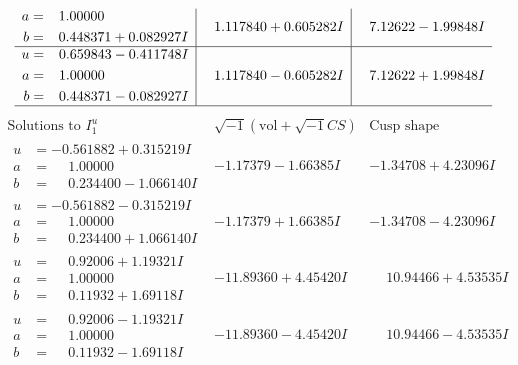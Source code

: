 \documentclass[1p]{elsarticle_modified}
\theoremstyle{definition}
\newcommand{\I}{\sqrt{-1}}
\begin{document}
$$\begin{array}{c|c|c}
\begin{aligned}
a &= \phantom{-}1.00000\phantom{ +0.000000I} \\
b &= \phantom{-}0.448371 + 0.082927 I\end{aligned}
 & \phantom{-}1.117840 + 0.605282 I & \phantom{-}7.12622 - 1.99848 I \\ \hline\begin{aligned}
u &= \phantom{-}0.659843 - 0.411748 I \\
a &= \phantom{-}1.00000\phantom{ +0.000000I} \\
b &= \phantom{-}0.448371 - 0.082927 I\end{aligned}
 & \phantom{-}1.117840 - 0.605282 I & \phantom{-}7.12622 + 1.99848 I\\
 \hline 
 \end{array}$$\newpage$$\begin{array}{c|c|c}  
\text{Solutions to }I^u_{1}& \I (\text{vol} + \sqrt{-1}CS) & \text{Cusp shape}\\
 \hline 
\begin{aligned}
u &= -0.561882 + 0.315219 I \\
a &= \phantom{-}1.00000\phantom{ +0.000000I} \\
b &= \phantom{-}0.234400 - 1.066140 I\end{aligned}
 & -1.17379 - 1.66385 I & -1.34708 + 4.23096 I \\ \hline\begin{aligned}
u &= -0.561882 - 0.315219 I \\
a &= \phantom{-}1.00000\phantom{ +0.000000I} \\
b &= \phantom{-}0.234400 + 1.066140 I\end{aligned}
 & -1.17379 + 1.66385 I & -1.34708 - 4.23096 I \\ \hline\begin{aligned}
u &= \phantom{-}0.92006 + 1.19321 I \\
a &= \phantom{-}1.00000\phantom{ +0.000000I} \\
b &= \phantom{-}0.11932 + 1.69118 I\end{aligned}
 & -11.89360 + 4.45420 I & \phantom{-}10.94466 + 4.53535 I \\ \hline\begin{aligned}
u &= \phantom{-}0.92006 - 1.19321 I \\
a &= \phantom{-}1.00000\phantom{ +0.000000I} \\
b &= \phantom{-}0.11932 - 1.69118 I\end{aligned}
 & -11.89360 - 4.45420 I & \phantom{-}10.94466 - 4.53535 I \\ \hline\begin{aligned}

\end{aligned}
\end{array}$$
\end{document}
